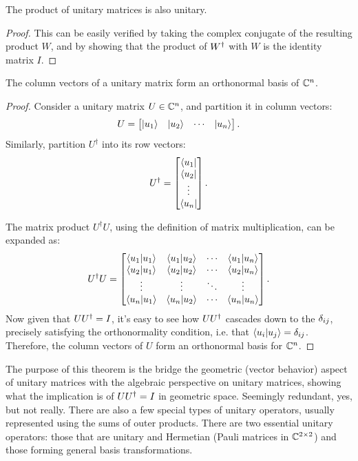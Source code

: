 \documentclass[12pt]{article}
\begin{document}
\begin{theorem}
    The product of unitary matrices is also unitary. 
\end{theorem}

\begin{proof}
    This can be easily verified by taking the complex conjugate of the resulting product $W$, and by showing that the product of ${W}^{\dagger}$ with $W$ is the identity matrix $I$. 
\end{proof}

\begin{theorem}
    The column vectors of a unitary matrix form an orthonormal basis of $\mathbb{C}^n$.  
\end{theorem}

\begin{proof}
    Consider a unitary matrix $U \in \mathbb{C}^n$, and partition it in column vectors:
    \[
    U = \begin{bmatrix}
        \ket{u_1} & \ket{u_2} & \cdots & \ket{u_n}
    \end{bmatrix}.
    \]
    Similarly, partition \(U^{\dagger}\) into its row vectors:
    \[
    U^{\dagger} = 
    \begin{bmatrix}
    \bra{u_1} \\
    \bra{u_2} \\
    \vdots \\
    \bra{u_n}
    \end{bmatrix}.
    \]

    The matrix product \(U^{\dagger}U\), using the definition of matrix multiplication, can be expanded as:
    \[
    U^{\dagger}U = 
    \begin{bmatrix}
    \braket{u_1}{u_1} & \braket{u_1}{u_2} & \cdots & \braket{u_1}{u_n} \\
    \braket{u_2}{u_1} & \braket{u_2}{u_2} & \cdots & \braket{u_2}{u_n} \\
    \vdots & \vdots & \ddots & \vdots \\
    \braket{u_n}{u_1} & \braket{u_n}{u_2} & \cdots & \braket{u_n}{u_n}
    \end{bmatrix}.
    \]
    Now given that $U {U}^{\dagger} = I$, it's easy to see how $U {U}^{\dagger}$ cascades down to the $\delta_{ij}$, precisely satisfying the orthonormality condition, i.e. that $\braket{u_i}{u_j} = \delta_{ij}$. Therefore, the column vectors of $U$ form an orthonormal basis for $\mathbb{C}^n$. 
\end{proof}

The purpose of this theorem is the bridge the geometric (vector behavior) aspect of unitary matrices with the algebraic perspective on unitary matrices, showing what the implication is of $U {U}^{\dagger} = I$ in geometric space. Seemingly redundant, yes, but not really. There are also a few special types of unitary operators, usually represented using the sums of outer products. There are two essential unitary operators: those that are unitary and Hermetian (Pauli matrices in $\mathbb{C}^{2 \times 2}$) and those forming general basis transformations. 
\end{document}
